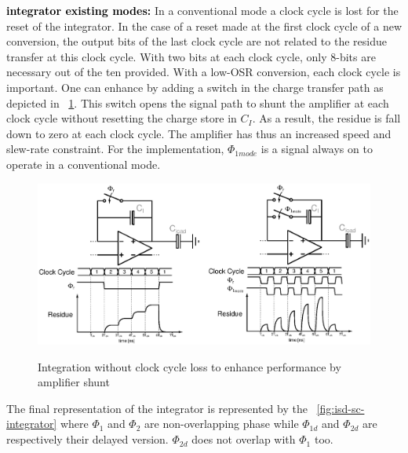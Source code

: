 \textbf{\textcolor{black}{integrator existing modes:}}
In a conventional mode a clock cycle is lost for the reset of the integrator. In the case of a reset made at the first clock cycle of a new conversion, the output bits of the last clock cycle are not related to the residue transfer at this clock cycle. With two bits at each clock cycle, only 8-bits are necessary out of the ten provided. With a low-OSR conversion, each clock cycle is important. One can enhance by adding a switch in the charge transfer path as depicted in \figurename~\ref{fig:sigma-delta-modes-integration}. This switch opens the signal path to shunt the amplifier at each clock cycle without resetting the charge store in $C_I$. As a result, the residue is fall down to zero at each clock cycle. The amplifier has thus an increased speed and slew-rate constraint. For the implementation, \(\Phi_{1mode} \) is a signal always on to operate in a conventional mode.

\begin{figure}[htp]
	\centering
	\includegraphics[width=\textwidth]{Chapter4/Figs/sigma-delta-modes-integration.ps}
	\begin{subfigure}[b]{0.48\textwidth}
		\centering
	\end{subfigure}
	\begin{subfigure}[b]{0.48\textwidth}
		\centering
	\end{subfigure}
	\caption{Integration without clock cycle loss to enhance performance by amplifier shunt}
	\label{fig:sigma-delta-modes-integration}
\end{figure}

The final representation of the integrator is represented by the \figurename~\ref{fig:isd-sc-integrator} where \(\Phi_1 \) and \(\Phi_2 \) are non-overlapping phase while \(\Phi_{1d} \) and \(\Phi_{2d} \) are respectively their delayed version. \(\Phi_{2d} \) does not overlap with \(\Phi_1 \) too.

